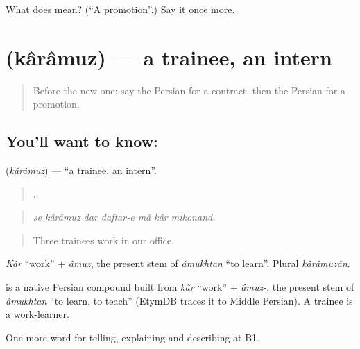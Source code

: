 \begin{tcolorbox}[breakable,colback=teal!4,colframe=teal!35!black,title={Before you move on}]
What does  mean? (\textquotedblleft{}A promotion\textquotedblright{}.) Say it once more.
\end{tcolorbox}
\section[\texorpdfstring{\fa{کارآموز} (kârâmuz)}{کارآموز (kârâmuz)}]{ (kârâmuz) — a trainee, an intern}

\label{lesson:FA-C380-karamuz}



\begin{quote}
Before the new one: say the Persian for a contract, then the Persian for a promotion.
\end{quote}

\subsection*{You'll want to know: }
\textbf{} (\emph{kârâmuz}) — \textquotedblleft{}a trainee, an intern\textquotedblright{}.

\begin{quote}
      .
\end{quote}

\begin{quote}
\emph{se kârâmuz dar daftar-e mâ kâr mikonand.}
\end{quote}

\begin{quote}
Three trainees work in our office.
\end{quote}

\emph{Kâr} \textquotedblleft{}work\textquotedblright{} + \emph{âmuz}, the present stem of \emph{âmukhtan} \textquotedblleft{}to learn\textquotedblright{}. Plural \emph{kârâmuzân}.

\begin{cousinweb}
\textbf{} is a native Persian compound built from \emph{kâr} \textquotedblleft{}work\textquotedblright{} + \emph{âmuz-}, the present stem of \emph{âmukhtan} \textquotedblleft{}to learn, to teach\textquotedblright{} (EtymDB traces it to Middle Persian). A trainee is a work-learner.
\end{cousinweb}

\begin{grammarlens}[title={What you've built}]
One more word for telling, explaining and describing at B1.
\end{grammarlens}

